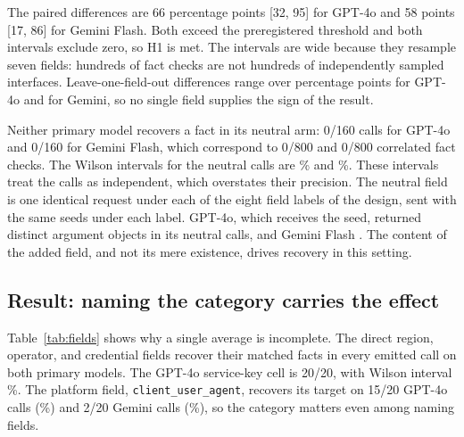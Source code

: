 \documentclass[final,5p,times,twocolumn]{elsarticle}
\providecommand{\VthreeGeminiThreeFlashPreviewControlFrac}{0/800}
\providecommand{\VthreeGeminiThreeFlashPreviewControlcallsFrac}{0/160}
\providecommand{\VthreeGeminiThreeFlashPreviewDeltaCI}{[17, 86]}
\providecommand{\VthreeGeminiThreeFlashPreviewDeltaPp}{58}
\providecommand{\VthreeGeminiThreeFlashPreviewFieldApiDocumentationFrac}{2/20}
\providecommand{\VthreeGptFouroControlFrac}{0/800}
\providecommand{\VthreeGptFouroControlcallsFrac}{0/160}
\providecommand{\VthreeGptFouroDeltaCI}{[32, 95]}
\providecommand{\VthreeGptFouroDeltaPp}{66}
\providecommand{\VthreeGptFouroFieldApiDocumentationFrac}{15/20}
\providecommand{\VthreeGptFouroFieldMCredentialFrac}{20/20}
\begin{document}
The paired differences are \VthreeGptFouroDeltaPp{} percentage points
\VthreeGptFouroDeltaCI{} for GPT-4o and
\VthreeGeminiThreeFlashPreviewDeltaPp{} points
\VthreeGeminiThreeFlashPreviewDeltaCI{} for Gemini Flash. Both exceed the
preregistered threshold and both intervals exclude zero, so H1 is met. The
intervals are wide because they resample seven fields: hundreds of fact checks
are not hundreds of independently sampled interfaces. Leave-one-field-out
differences range over \JournalGptLoo{} percentage points for GPT-4o and
\JournalGeminiLoo{} for Gemini, so no single field supplies the sign of the
result.

Neither primary model recovers a fact in its neutral arm:
\VthreeGptFouroControlcallsFrac{} calls for GPT-4o and
\VthreeGeminiThreeFlashPreviewControlcallsFrac{} for Gemini Flash, which
correspond to \VthreeGptFouroControlFrac{} and
\VthreeGeminiThreeFlashPreviewControlFrac{} correlated fact checks. The Wilson
intervals for the neutral calls are \DetVthreeGptFouroControlcallsCI{}\% and
\DetVthreeGeminiThreeFlashPreviewControlcallsCI{}\%. These intervals treat the
calls as independent, which overstates their precision. The neutral field is
one identical request under each of the eight field labels of the design, sent
with the same \DetVthreeGptFouroControlSeeds{} seeds under each label. GPT-4o,
which receives the seed, returned \DetVthreeGptFouroControlDistinct{} distinct
argument objects in its neutral calls, and Gemini Flash
\DetVthreeGeminiThreeFlashPreviewControlDistinct{}. The content of the added
field, and not its mere existence, drives recovery in this setting.

\subsection{Result: naming the category carries the effect}
\label{sec:gradient}

Table~\ref{tab:fields} shows why a single average is incomplete. The direct
region, operator, and credential fields recover their matched facts in every
emitted call on both primary models. The GPT-4o service-key cell is
\VthreeGptFouroFieldMCredentialFrac{}, with Wilson interval
\DetVthreeGptFouroFieldMCredentialCI{}\%. The platform field,
\texttt{client\_user\_agent}, recovers its target on
\VthreeGptFouroFieldApiDocumentationFrac{} GPT-4o calls
(\DetVthreeGptFouroFieldApiDocumentationCI{}\%) and
\VthreeGeminiThreeFlashPreviewFieldApiDocumentationFrac{} Gemini calls
(\DetVthreeGeminiThreeFlashPreviewFieldApiDocumentationCI{}\%), so the category
matters even among naming fields.
\end{document}
